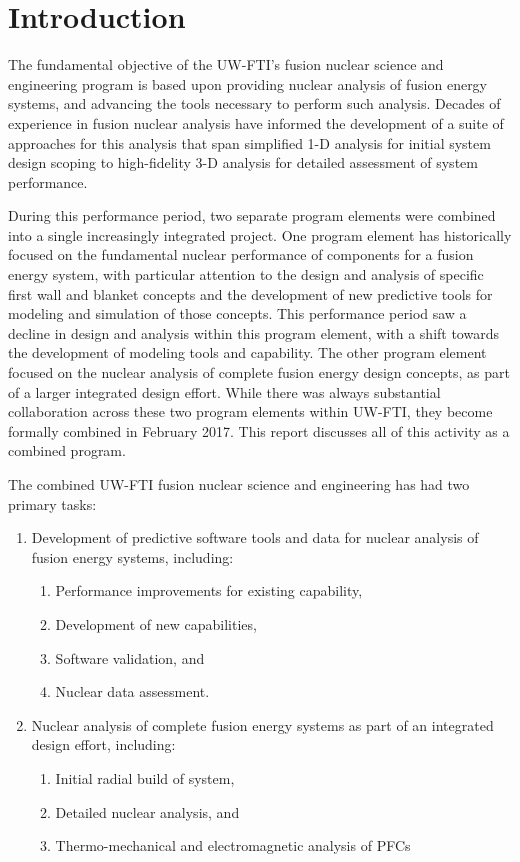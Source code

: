 \section{Introduction}

The fundamental objective of the \gls{UW-FTI}'s fusion nuclear science and
engineering program is based upon providing nuclear analysis of fusion energy
systems, and advancing the tools necessary to perform such analysis.  Decades
of experience in fusion nuclear analysis have informed the development of a
suite of approaches for this analysis that span simplified 1-D analysis for
initial system design scoping to high-fidelity 3-D analysis for detailed
assessment of system performance.

During this performance period, two separate program elements were combined
into a single increasingly integrated project.  One program element has
historically focused on the fundamental nuclear performance of components for
a fusion energy system, with particular attention to the design and analysis
of specific first wall and blanket concepts and the development of new
predictive tools for modeling and simulation of those concepts.  This
performance period saw a decline in design and analysis within this program
element, with a shift towards the development of modeling tools and
capability.  The other program element focused on the nuclear analysis of
complete fusion energy design concepts, as part of a larger integrated design
effort.  While there was always substantial collaboration across these two
program elements within \gls{UW-FTI}, they become formally combined in
February 2017.  This report discusses all of this activity as a combined
program.

The combined \gls{UW-FTI} fusion nuclear science and engineering has had two
primary tasks:
\begin{enumerate}
\item Development of predictive software tools and data for nuclear analysis
  of fusion energy systems, including:
  \begin{enumerate}
  \item Performance improvements for existing capability,
  \item Development of new capabilities,
  \item Software validation, and
  \item Nuclear data assessment.
  \end{enumerate}
\item Nuclear analysis of complete fusion energy systems as part of an
  integrated design effort, including:
  \begin{enumerate}
  \item Initial radial build of system,
  \item Detailed nuclear analysis, and
  \item Thermo-mechanical and electromagnetic analysis of \glspl{PFC}
  \end{enumerate}
\end{enumerate}


